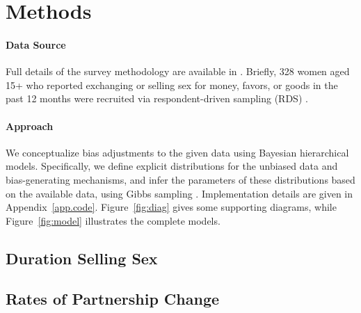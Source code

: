 \section{Methods}\label{meth}
\paragraph{Data Source}
Full details of the survey methodology are available in \cite{Yam2013}.
Briefly, 328 women aged 15+
who reported exchanging or selling sex for money, favors, or goods in the past 12 months
were recruited via respondent-driven sampling (RDS) \cite{Heckathorn1997}.
\paragraph{Approach}
We conceptualize bias adjustments to the given data using Bayesian hierarchical models. 
Specifically, we define explicit distributions for the unbiased data and bias-generating mechanisms, %
and infer the parameters of these distributions based on the available data,
using Gibbs sampling \cite{Geman1984}.
Implementation details are given in Appendix~\ref{app.code}.
Figure~\ref{fig:diag} gives some supporting diagrams, while
Figure~\ref{fig:model} illustrates the complete models.

\subsection{Duration Selling Sex}\label{meth.yss}


\subsection{Rates of Partnership Change}\label{meth.parts}

